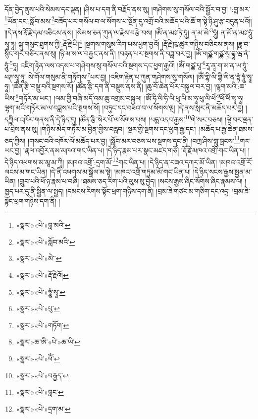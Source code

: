 དོན་བྱེད་ནུས་པའི་སེམས་དང་ལྡན། །ཤིས་པ་དག་ནི་བརྗོད་ནས་སུ། །གཤེགས་སུ་གསོལ་བའི་སྦྱོར་བ་བྱ། །:བླ་མར་\footnote{«སྣར་»«པེ་»བླ་མའི་}ཡོན་དང་:སློབ་མས་\footnote{«སྣར་»«པེ་»སློབ་མའི་}བཟོད་པར་གསོལ་བ་ལ་སོགས་པ་སྔོན་དུ་འགྲོ་བའི་མཆོད་པའི་ཆོ་ག་སྟེ་ཉི་ཤུ་རྩ་བདུན་པའོ།། །།དེ་ནས་རྡོ་རྗེ་དམ་བཅིངས་ནས། །སེམས་ཅན་ཀུན་ལ་རྗེས་བརྩེ་བས། །ཨོཾ་ན་མཿ་ཏེ་ཧཱུཾ། ན་མ་མེ་\footnote{«སྣར་»«པེ་»མེ་་}ཧཱུཾ། ན་མོ་ན་མཿ་ཧཱུཾ་སྭཱ་ཧཱ། སྐུ་གསུང་ཐུགས་ཀྱི་:རྡོ་རྗེ་ཡི།\footnote{«སྣར་»«པེ་»རྡོ་རྗེའོ།} །སྔགས་གསུམ་རིག་པས་ཕྱག་བྱའོ། །རྡོ་རྗེ་ཁུ་ཚུར་གཉིས་བཅིངས་ནས། །ཟླ་བ་སྙིང་གར་བཙིར་ནས་སུ། །ཉི་མ་ས་ལ་བརྐྱང་ནས་ནི། །བརྟན་པར་སྔགས་ནི་བཟླ་བར་བྱ། །ཨོཾ་གཙྪ་གཙྪ་སྭ་བྷཱ་ཝ་ནཾ་ཧཱུཾ་\footnote{«སྣར་»«པེ་»ཧཱུཾ་སྭཱ་}ཧཱ། འཇིག་རྟེན་ལས་འདས་པ་གཤེགས་སུ་གསོལ་བའི་སྔགས་དང་ཕྱག་རྒྱའོ། །ཨོཾ་གཙྪ་པཱ་\footnote{«སྣར་»«པེ་»པུ་}རཱ་ནཱ་ག་མ་ན་ཡ་ཧཱུཾ་ཕཊ་སྭཱ་ཧཱ། སེ་གོལ་གསུམ་ནི་གཏོགས་\footnote{«སྣར་»«པེ་»གཏོག་}པར་བྱ། །འཇིག་རྟེན་པ་ཀུན་གཤེགས་སུ་གསོལ། །ཨོཾ་གྷི་ལི་གྷི་ལི་ན་དྷཾ་ཧཱུཾ་སྭཱ་ཧཱ། །ཚོན་རྩི་བསྡུ་བའི་སྔགས་སོ། །ཚོན་རྩི་དག་ནི་བསྡུས་ནས་ནི། །ཆུ་བོ་ཆེན་པོར་བསྐྱལ་བར་བྱ། །ལྷག་མའི་:ཆ་ཡིས་\footnote{«སྣར་»ཆ་ཨི་«པེ་»ཆ་ཡི་}གཏོར་མ་ཡང་། །ལམ་གྱི་བཞི་མདོ་འམ་ཆུ་འགྲམ་བསྐྱལ། །ཨོཾ་ཧི་ལི་ཧི་ལི་ཕུ་ལི་མ་ཧཱ་ཕུ་ལི་ཕེཾ་\footnote{«སྣར་»«པེ་»ཕོཾ་}ཕོཾ་ཕིཾ་སྭཱ་ཧཱ། ལྷག་མའི་གཏོར་མ་ལ་བཟླས་པའི་སྔགས་སོ། །བཏུང་དང་བཟའ་བ་ལ་སོགས་ལྔ། །དེ་ནས་སླར་ནི་མཆོད་པར་བྱ། །དཀྱིལ་འཁོར་གནས་ནི་དེ་ཉིད་དུ། །ཚོན་རྩི་སེར་པོ་ལ་སོགས་པས། །པདྨ་འདབ་རྒྱས་\footnote{«སྣར་»«པེ་»བརྒྱད་}གེ་སར་བཅས། །ལྟེ་བར་ལྡན་པ་བྲིས་ནས་སུ། །གཉིས་མེད་གཏོར་མ་བྱིན་གྱིས་བརླབ། །སྔར་གྱི་སྔགས་དང་ཕྱག་རྒྱ་དང་། །མཆོད་པ་རྒྱ་ཆེན་ཐམས་ཅད་ཀྱིས། །གསང་བའི་འཁོར་ལོ་མཆོད་པར་བྱ། །སློབ་མར་བཅས་པས་སྔགས་དང་ནི། །བཀྲ་ཤིས་གླུ་བླངས་\footnote{«སྣར་»«པེ་»བླང་}གར་ཡང་བྱ། །རྣལ་འབྱོར་ནམ་མཁའ་གང་ཡིན་པ། །དེ་ཉིད་རྣམ་པར་སྣང་མཛད་གཙོ། །རྡོ་རྗེ་མཁའ་འགྲོ་གང་ཡིན་པ། །དེ་ཉིད་འཕགས་མ་མཱ་མ་ཀཱི། །མཁའ་འགྲོ་:དྲག་མོ་\footnote{«སྣར་»«པེ་»དྲག་མ་}གང་ཡིན་པ། །དེ་ཉིད་ན་བཟའ་དཀར་མོ་ཡིན། །མཁའ་འགྲོ་རོ་ལངས་མ་གང་ཡིན། །དེ་ནི་འཕགས་མ་སྒྲོལ་མ་སྟེ། །མཁའ་འགྲོ་གཏུམ་མོ་གང་ཡིན་པ། །དེ་ཉིད་སངས་རྒྱས་སྤྱན་མ་ཡིན། །གྲུབ་པའི་ཕོ་ཉ་རྣམ་པ་བཞི། །ཐམས་ཅད་རིག་པའི་ལུས་སུ་བྱེད། །སངས་རྒྱས་ཞིང་སོགས་ཞིང་རྣམས་ལ། །ཁྱད་པར་དུ་ནི་སྦྱིན་ལ་སྤྱད། །དམངས་རིགས་སྟོང་ཕྲག་གཉིས་དག་ནི། །བྲམ་ཟེ་གཙང་མ་གཅིག་དང་འདྲ། །བྲམ་ཟེ་སྟོང་ཕྲག་གཉིས་དག་ནི། །
